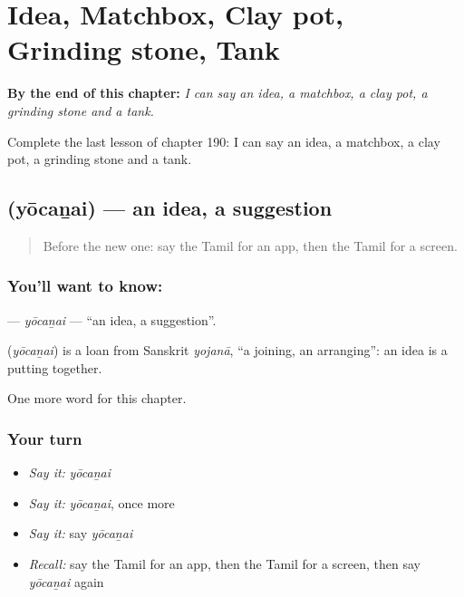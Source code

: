 
\chapter{Idea, Matchbox, Clay pot, Grinding stone, Tank}
\label{ch:ta-idea-matchbox-clay-pot-grinding-stone-tank}

\begin{chapteropening}
\textbf{By the end of this chapter:} \emph{I can say an idea, a matchbox, a clay pot, a grinding stone and a tank.}

Complete the last lesson of chapter 190: I can say an idea, a matchbox, a clay pot, a grinding stone and a tank.
\end{chapteropening}

\section[\texorpdfstring{\ta{யோசனை} (yōcaṉai)}{யோசனை (yōcaṉai)}]{ (yōcaṉai) — an idea, a suggestion}

\label{lesson:TA-C190-yocanai}



\begin{quote}
Before the new one: say the Tamil for an app, then the Tamil for a screen.
\end{quote}

\subsection*{You'll want to know: }
\textbf{} — \emph{yōcaṉai} — \textquotedblleft{}an idea, a suggestion\textquotedblright{}.

\begin{cousinweb}
\textbf{} (\emph{yōcaṉai}) is a loan from Sanskrit \emph{yojanā}, \textquotedblleft{}a joining, an arranging\textquotedblright{}: an idea is a putting together.
\end{cousinweb}

\begin{grammarlens}[title={What you've built}]
One more word for this chapter.
\end{grammarlens}

\subsection*{Your turn}
\begin{itemize}
\raggedright
  \item \emph{Say it:} \emph{yōcaṉai}
  \item \emph{Say it:} \emph{yōcaṉai}, once more
  \item \emph{Say it:} say \emph{yōcaṉai}
  \item \emph{Recall:} say the Tamil for an app, then the Tamil for a screen, then say \emph{yōcaṉai} again
\end{itemize}

